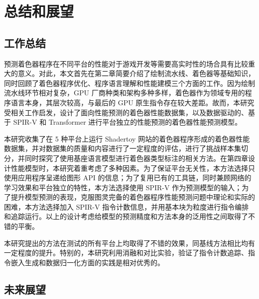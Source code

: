 \chapter{总结和展望}

\section{工作总结}

预测着色器程序在不同平台的性能对于游戏开发等需要高实时性的场合具有比较重大的意义。对此，本文首先在第二章简要介绍了绘制流水线、着色器等基础知识，同时回顾了着色器程序优化、程序语言理解和性能建模三个方面的工作。因为绘制流水线环节相对复杂，GPU 厂商种类和架构多种多样，着色器作为领域专用的程序语言本身，其层次较高，与最后的 GPU 原生指令存在较大差距。故而，本研究受相关工作启发，设计了{\amend 面向性能预测的着色器性能数据集，以及}数据驱动的、基于 SPIR-V 和 Transformer 进行平台独立的性能预测的{\amend 着色器性能预测模型}。

本研究收集了在 5 种平台上运行 Shadertoy 网站的着色器程序形成的着色器性能数据集，并对数据集的质量和内容进行了一定程度的评估{\added ，进行了挑战样本集切分，并同时探究了使用基座语言模型进行着色器类型标注的相关方法。}在{\amend 第四章}设计性能模型时，本研究着重考虑了多种因素。为了保证平台无关性，本方法选择只使用应用程序呈递给图形 API 的信息；为了复用已有的工具链，同时兼顾网络的学习效果和平台独立的特性，本方法选择使用 SPIR-V 作为预测模型的输入；为了提升模型预测的表现，克服图灵完备的着色器程序性能预测问题中理论和实际的困难，本方法选择加入 SPIR-V 指令计数信息，并用基本块为粒度进行指令编排和追踪运行。以上的设计考虑给模型的预测精度和方法本身的泛用性之间取得了不错的平衡。

本研究提出的方法在测试的所有平台上均取得了不错的效果，同基线方法相比均有一定程度的提升。特别的，本研究利用消融和对比实验，验证了指令计数追踪、指令嵌入生成和数据归一化方面的实践是相对优秀的。

\section{未来展望}


